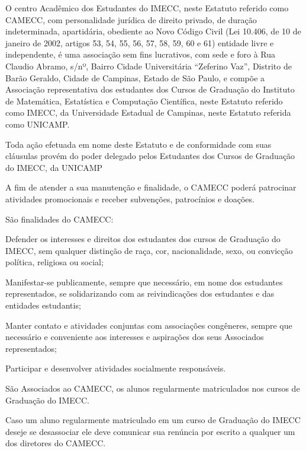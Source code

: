 \documentclass{estatuto}
\begin{document}


\artigo O centro Acadêmico dos Estudantes do IMECC, neste Estatuto referido como CAMECC, com personalidade jurídica de direito privado, de duração indeterminada, apartidária, obediente ao Novo Código Civil (Lei 10.406, de 10 de janeiro de 2002, artigos 53, 54, 55, 56, 57, 58, 59, 60 e 61) entidade livre e independente, é uma associação sem fins lucrativos, com sede e foro à Rua Claudio Abramo, s/nº, Bairro Cidade Universitária “Zeferino Vaz”, Distrito de Barão Geraldo, Cidade de Campinas, Estado de São Paulo, e compõe a Associação representativa dos estudantes dos Cursos de Graduação do Instituto de Matemática, Estatística e Computação Científica, neste Estatuto referido como IMECC, da Universidade Estadual de Campinas, neste Estatuto referida como UNICAMP.

\paragrafo Toda ação efetuada em nome deste Estatuto e de conformidade com suas cláusulas provém do poder delegado pelos Estudantes dos Cursos de Graduação do IMECC, da UNICAMP

\paragrafo A fim de atender a sua manutenção e finalidade, o CAMECC poderá patrocinar atividades promocionais e receber subvenções, patrocínios e doações.

\artigo São finalidades do CAMECC:

\inciso Defender os interesses e direitos dos estudantes dos cursos de Graduação do IMECC, sem qualquer distinção de raça, cor, nacionalidade, sexo, ou convicção política, religiosa ou social;

\inciso Manifestar-se publicamente, sempre que necessário, em nome dos estudantes representados, se solidarizando com as reivindicações dos estudantes e das entidades estudantis;

\inciso Manter contato e atividades conjuntas com associações congêneres, sempre que necessário e conveniente aos interesses e aspirações dos seus Associados representados;

\inciso Participar e desenvolver atividades socialmente responsáveis.


\artigo São Associados ao CAMECC, os alunos regularmente matriculados nos cursos de Graduação do IMECC.

\inciso Caso um aluno regularmente matriculado em um curso de Graduação do IMECC deseje se desassociar ele deve comunicar sua renúncia por escrito a qualquer um dos diretores do CAMECC.
\end{document}
